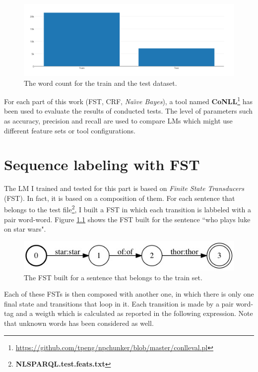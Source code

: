 \documentclass[a4paper,7pt,oneside]{book}
\begin{document}
\begin{figure}[h!]
  \centering
    \includegraphics[scale=0.5]{res/crf_dataset_small}
    \caption{The word count for the train and the test dataset.}
    \label{fig:crf_dataset}
\end{figure}

\noindent
For each part of this work (FST, CRF, \textit{Na\"{\i}ve Bayes}), a tool named \textbf{CoNLL}\footnote{\url{https://github.com/tpeng/npchunker/blob/master/conlleval.pl}} has been used to evaluate the results of conducted tests. The level of parameters such as accuracy, precision and recall are used to compare LMs which might use different feature sets or tool configurations.

\chapter{Sequence labeling with FST}

The LM I trained and tested for this part is based on \textit{Finite State Transducers} (FST). In fact, it is based on a composition of them. For each sentence that belongs to the test file\footnote{\textbf{NLSPARQL.test.feats.txt}}, I built a FST in which each transition is labbeled with a pair word-word. Figure \ref{fig:fst_train_example} shows the FST built for the sentence ``who plays luke on star wars".

\begin{figure}[h!]
  \centering
    \includegraphics[scale=0.4]{res/fst_train_example}
    \caption{The FST built for a sentence that belongs to the train set.}
    \label{fig:fst_train_example}
\end{figure}

\noindent
Each of these FSTs is then composed with another one, in which there is only one final state and transitions that loop in it. Each transition is made by a pair word-tag and a weigth which is calculated as reported in the following expression. Note that unknown words has been considered as well.
\end{document}
